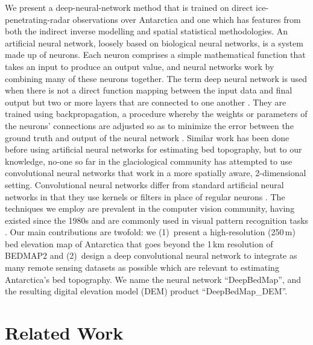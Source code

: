 \documentclass[tc, noline]{copernicus}
\begin{document}
We present a deep-neural-network method that is trained on direct ice-penetrating-radar observations over Antarctica and one which has features from both the indirect inverse modelling and spatial statistical methodologies.
An artificial neural network, loosely based on biological neural networks, is a system made up of neurons.
Each neuron comprises a simple mathematical function that takes an input to produce an output value, and neural networks work by combining many of these neurons together.
The term deep neural network is used when there is not a direct function mapping between the input data and final output but two or more layers that are connected to one another \citep[see][for a review]{LeCunDeeplearning2015}.
They are trained using backpropagation, a procedure whereby the weights or parameters of the neurons' connections are adjusted so as to minimize the error between the ground truth and output of the neural network \citep{RumelhartLearningrepresentationsbackpropagating1986}.
Similar work has been done before using artificial neural networks for estimating bed topography\citep[e.g.][]{ClarkeNeuralNetworksApplied2009,MonnierInferencebedtopography2018}, but to our knowledge, no-one so far in the glaciological community has attempted to use convolutional neural networks that work in a more spatially aware, 2-dimensional setting.
Convolutional neural networks differ from standard artificial neural networks in that they use kernels or filters in place of regular neurons \citep[again, see][for a review]{LeCunDeeplearning2015}.
The techniques we employ are prevalent in the computer vision community, having existed since the 1980s \citep{FukushimaNeocognitronnewalgorithm1982,LeCunBackpropagationAppliedHandwritten1989} and are commonly used in visual pattern recognition tasks \citep[e.g.][]{LecunGradientbasedlearningapplied1998,KrizhevskyImageNetClassificationDeep2012}.
Our main contributions are twofold:
we (1)~present a high-resolution (250\,\unit{m}) bed elevation map of Antarctica that goes beyond the 1\,\unit{km} resolution of BEDMAP2 \citep{FretwellBedmap2improvedice2013} and
(2)~design a deep convolutional neural network to integrate as many remote sensing datasets as possible which are relevant to estimating Antarctica's bed topography.
We name the neural network ``DeepBedMap'', and the resulting digital elevation model (DEM) product ``DeepBedMap\_DEM''.


\section{Related Work}
\end{document}
